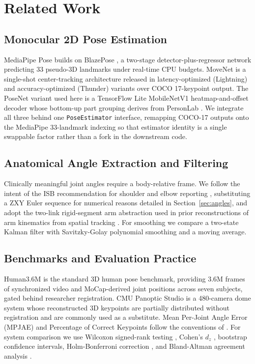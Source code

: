 \documentclass[conference]{IEEEtran}
\begin{document}
\section{Related Work}

\subsection{Monocular 2D Pose Estimation}
MediaPipe Pose builds on BlazePose \cite{bazarevsky2020blazepose}, a
two-stage detector-plus-regressor network predicting 33 pseudo-3D
landmarks under real-time CPU budgets. MoveNet \cite{movenet2021blog} is
a single-shot center-tracking architecture released in latency-optimized
(Lightning) and accuracy-optimized (Thunder) variants over COCO
17-keypoint output. The PoseNet variant used here is a TensorFlow Lite
MobileNetV1 heatmap-and-offset decoder whose bottom-up part grouping
derives from PersonLab \cite{papandreou2018personlab}. We integrate all
three behind one \texttt{PoseEstimator} interface, remapping COCO-17
outputs onto the MediaPipe 33-landmark indexing so that estimator
identity is a single swappable factor rather than a fork in the
downstream code.

\subsection{Anatomical Angle Extraction and Filtering}
Clinically meaningful joint angles require a body-relative frame. We
follow the intent of the ISB recommendation for shoulder and elbow
reporting \cite{wu2005isb}, substituting a ZXY Euler sequence for
numerical reasons detailed in Section~\ref{sec:angles}, and adopt the
two-link rigid-segment arm abstraction used in prior reconstructions of
arm kinematics from spatial tracking \cite{biryukova2000kinematics,
koritnik2003kinematic}. For smoothing we compare a two-state Kalman
filter \cite{kalman1960new} with Savitzky-Golay polynomial smoothing
\cite{savitzky1964smoothing} and a moving average.

\subsection{Benchmarks and Evaluation Practice}
Human3.6M \cite{ionescu2014human36m} is the standard 3D human pose
benchmark, providing 3.6M frames of synchronized video and MoCap-derived
joint positions across seven subjects, gated behind researcher
registration. CMU Panoptic Studio \cite{joo2015panoptic} is a 480-camera
dome system whose reconstructed 3D keypoints are partially distributed
without registration and are commonly used as a substitute. Mean
Per-Joint Angle Error (MPJAE) and Percentage of Correct Keypoints follow
the conventions of \cite{yang2011articulated, mehta2017vnect}. For
system comparison we use Wilcoxon signed-rank testing
\cite{wilcoxon1945individual}, Cohen's $d_z$ \cite{cohen1988statistical},
bootstrap confidence intervals, Holm-Bonferroni correction
\cite{holm1979simple}, and Bland-Altman agreement analysis
\cite{bland1986statistical}.
\end{document}
